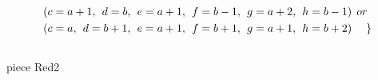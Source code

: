 \begin{align*}
&(c = a+1,\hspace{1ex}d = b,\hspace{1ex}e = a+1, \hspace{1ex}f = b-1,\hspace{1ex}g=a+2,\hspace{1ex}h=b-1)\hspace{1ex} or\\
&(c = a,\hspace{1ex}d = b+1,\hspace{1ex}e = a+1, \hspace{1ex}f = b+1,\hspace{1ex}g=a+1,\hspace{1ex}h=b+2)\hspace{3ex} \} 
\end{align*}
\\ piece Red2 
